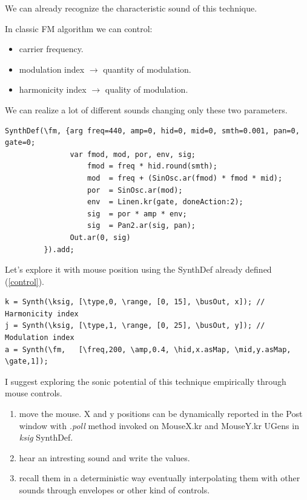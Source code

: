 We can already recognize the characteristic sound of this technique.

In classic FM algorithm we can control:

\begin{itemize}
\tightlist 
\item carrier frequency.
\item modulation index \(\rightarrow\) quantity of modulation. 
\item harmonicity index \(\rightarrow\) quality of modulation.
\end{itemize}

We can realize a lot of different sounds changing only these two parameters.

\begin{lstlisting}[frame=single, caption=Classic FM model] 
SynthDef(\fm, {arg freq=440, amp=0, hid=0, mid=0, smth=0.001, pan=0, gate=0;
               var fmod, mod, por, env, sig;
                   fmod = freq * hid.round(smth);
                   mod  = freq + (SinOsc.ar(fmod) * fmod * mid);
                   por  = SinOsc.ar(mod);
                   env  = Linen.kr(gate, doneAction:2);
                   sig  = por * amp * env;
                   sig  = Pan2.ar(sig, pan);
               Out.ar(0, sig)
         }).add;
\end{lstlisting}

Let's explore it with mouse position using the SynthDef already defined (\ref{control}).

\begin{lstlisting}[frame=single] 
k = Synth(\ksig, [\type,0, \range, [0, 15], \busOut, x]); // Harmonicity index
j = Synth(\ksig, [\type,1, \range, [0, 25], \busOut, y]); // Modulation index
a = Synth(\fm,   [\freq,200, \amp,0.4, \hid,x.asMap, \mid,y.asMap, \gate,1]);
\end{lstlisting}

I suggest exploring the sonic potential of this technique empirically through mouse controls.

\begin{enumerate}
\tightlist 
\item move the mouse. X and y positions can be dynamically reported in the Post window with \textit{.poll} method invoked on MouseX.kr and MouseY.kr UGens in \textit{ksig} SynthDef.

\item hear an intresting sound and write the values.

\item recall them in a deterministic way eventually interpolating them with other sounds through envelopes or other kind of controls.
\end{enumerate}

